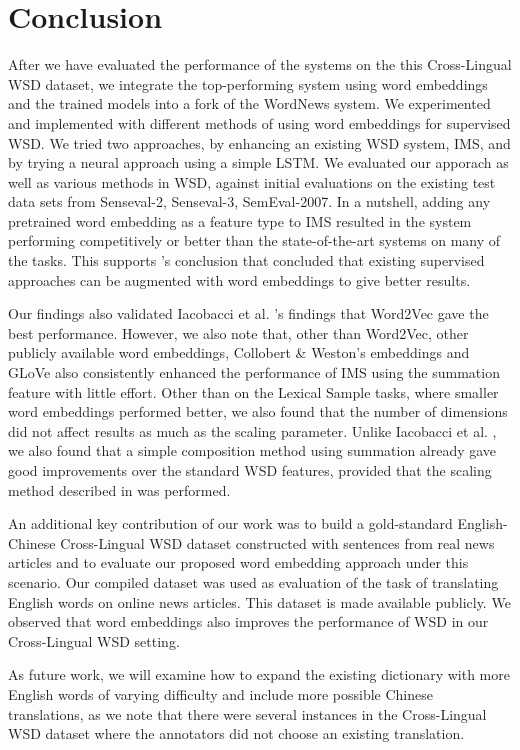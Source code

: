 \section{Conclusion}
\label{section:conclusion}

After we have evaluated the performance of the systems on the this
Cross-Lingual WSD dataset, we integrate the top-performing system
using word embeddings and the trained models into a fork of the
WordNews system. We experimented and implemented with different
methods of using word embeddings for supervised WSD. We tried two
approaches, by enhancing an existing WSD system, IMS, and by trying a
neural approach using a simple LSTM.  We evaluated our apporach as
well as various methods in WSD, against initial evaluations on the
existing test data sets from Senseval-2, Senseval-3, SemEval-2007. In
a nutshell, adding any pretrained word embedding as a feature type to
IMS resulted in the system performing competitively or better than the
state-of-the-art systems on many of the tasks. This supports
\cite{Iacobacci2016}'s conclusion that concluded that existing
supervised approaches can be augmented with word embeddings to give
better results.

Our findings also validated Iacobacci et al. 's
findings that Word2Vec gave the best performance. However, we also
note that, other than Word2Vec, other publicly available word
embeddings, Collobert \& Weston's embeddings and GLoVe also
consistently enhanced the performance of IMS using the summation
feature with little effort. Other than on the Lexical Sample tasks,
where smaller word embeddings performed better, we also found that the
number of dimensions did not affect results as much as the scaling
parameter. Unlike Iacobacci et al. , we also
found that a simple composition method using summation already gave
good improvements over the standard WSD features, provided that the
scaling method described in \cite{Taghipour15} was performed.

An additional key contribution of our work was to build a
gold-standard English-Chinese Cross-Lingual WSD dataset constructed
with sentences from real news articles and to evaluate our proposed
word embedding approach under this scenario.  Our compiled dataset was
used as evaluation of the task of translating English words on online
news articles. This dataset is made available publicly.  We observed
that word embeddings also improves the performance of WSD in our
Cross-Lingual WSD setting.

As future work, we will examine how to expand the existing dictionary
with more English words of varying difficulty and include more
possible Chinese translations, as we note that there were several
instances in the Cross-Lingual WSD dataset where the annotators did
not choose an existing translation. 

